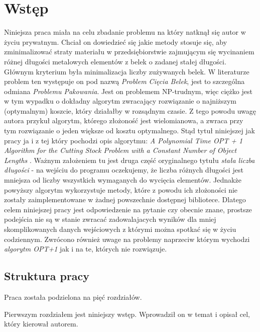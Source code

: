 \chapter{Wstęp}

\thispagestyle{chapterBeginStyle}
Niniejsza praca miała na celu zbadanie problemu na który natknął się autor w życiu prywatnym. Chciał on dowiedzieć się jakie metody stosuje się, aby zminimalizować straty materiału w przedsiębiorstwie zajmującym się wycinaniem różnej długości metalowych elementów z belek o zadanej stałej długości. Głównym kryterium była minimalizacja liczby zużywanych belek. W literaturze problem ten występuje on pod nazwą \textit{Problem Cięcia Belek}, jest to szczególna odmiana \textit{Problemu Pakowania}. Jest on problemem NP-trudnym, więc ciężko jest w tym wypadku o dokładny algorytm zwracający rozwiązanie o najniższym (optymalnym) koszcie, który działałby w rozsądnym czasie. Z tego powodu uwagę autora przykuł algorytm, którego złożoność jest wielomianowa, a zwraca przy tym rozwiązanie o jeden większe od kosztu optymalnego. Stąd tytuł niniejszej jak pracy ja i z tej który pochodzi opis algorytmu: \textit{A Polynomial Time OPT + 1 Algorithm for the Cutting Stock Problem with a Constant Number of Object Lengths} \cite{ALG_OPT_1}. Ważnym założeniem tu jest druga część oryginalnego tytułu \textit{stała liczba długości} - na wejściu do programu oczekujemy, że liczba różnych długości jest mniejsza od liczby wszystkich wymaganych do wycięcia elementów. Jednakże powyższy algorytm wykorzystuje metody, które z powodu ich złożoności nie zostały zaimplementowane w żadnej powszechnie dostępnej bibliotece. 
Dlatego celem niniejszej pracy jest odpowiedzenie na pytanie czy obecnie znane, prostsze podejścia nie są w stanie zwracać zadowalajacych wyników dla mniej skomplikowanych danych wejściowych z którymi można spotkać się w życiu codziennym. Zwrócono również uwage na problemy naprzeciw którym wychodzi \textit{algorytm OPT+1} jak i na te, których nie rozwiązuje.


\section*{Struktura pracy}
Praca została podzielona na pięć rozdziałów. 

Pierwszym rozdziałem jest niniejszy wstęp. Wprowadził on w temat i opisał cel, który kierował autorem.

